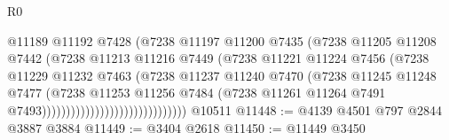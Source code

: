 \begin{lexlean}{R0}
\begin{coremodule}
                                              @11189
                                              @11192
                                              @7428
                                              (@7238
                                                @11197
                                                @11200
                                                @7435
                                                (@7238
                                                  @11205
                                                  @11208
                                                  @7442
                                                  (@7238
                                                    @11213
                                                    @11216
                                                    @7449
                                                    (@7238
                                                      @11221
                                                      @11224
                                                      @7456
                                                      (@7238
                                                        @11229
                                                        @11232
                                                        @7463
                                                        (@7238
                                                          @11237
                                                          @11240
                                                          @7470
                                                          (@7238
                                                            @11245
                                                            @11248
                                                            @7477
                                                            (@7238
                                                              @11253
                                                              @11256
                                                              @7484
                                                              (@7238
                                                                @11261
                                                                @11264
                                                                @7491
                                                                @7493))))))))))))))))))))))))))))))
    @10511
@11448 := @4139 @4501 @797 @2844 @3887 @3884
@11449 := @3404 @2618
@11450 := @11449 @3450

\end{coremodule}
\end{lexlean}
